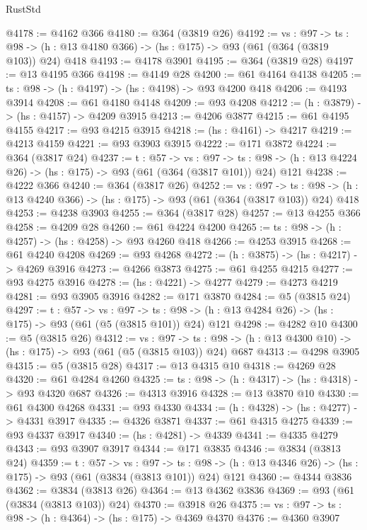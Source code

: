 \begin{lexlean}{RustStd}
\begin{coremodule}
@4178 := @4162 @366
@4180 := @364 (@3819 @26)
@4192 := {vs : @97} ->
  {ts : @98} -> (h : @13 @4180 @366) -> (hs : @175) -> @93 (@61 (@364 (@3819 @103)) @24) @418
@4193 := @4178 @3901
@4195 := @364 (@3819 @28)
@4197 := @13 @4195 @366
@4198 := @4149 @28
@4200 := @61 @4164 @4138
@4205 := {ts : @98} -> (h : @4197) -> (hs : @4198) -> @93 @4200 @418
@4206 := @4193 @3914
@4208 := @61 @4180 @4148
@4209 := @93 @4208
@4212 := (h : @3879) -> (hs : @4157) -> @4209 @3915
@4213 := @4206 @3877
@4215 := @61 @4195 @4155
@4217 := @93 @4215 @3915
@4218 := (hs : @4161) -> @4217
@4219 := @4213 @4159
@4221 := @93 @3903 @3915
@4222 := @171 @3872
@4224 := @364 (@3817 @24)
@4237 := {t : @57} ->
  {vs : @97} ->
  {ts : @98} -> (h : @13 @4224 @26) -> (hs : @175) -> @93 (@61 (@364 (@3817 @101)) @24) @121
@4238 := @4222 @366
@4240 := @364 (@3817 @26)
@4252 := {vs : @97} ->
  {ts : @98} -> (h : @13 @4240 @366) -> (hs : @175) -> @93 (@61 (@364 (@3817 @103)) @24) @418
@4253 := @4238 @3903
@4255 := @364 (@3817 @28)
@4257 := @13 @4255 @366
@4258 := @4209 @28
@4260 := @61 @4224 @4200
@4265 := {ts : @98} -> (h : @4257) -> (hs : @4258) -> @93 @4260 @418
@4266 := @4253 @3915
@4268 := @61 @4240 @4208
@4269 := @93 @4268
@4272 := (h : @3875) -> (hs : @4217) -> @4269 @3916
@4273 := @4266 @3873
@4275 := @61 @4255 @4215
@4277 := @93 @4275 @3916
@4278 := (hs : @4221) -> @4277
@4279 := @4273 @4219
@4281 := @93 @3905 @3916
@4282 := @171 @3870
@4284 := @5 (@3815 @24)
@4297 := {t : @57} ->
  {vs : @97} ->
  {ts : @98} -> (h : @13 @4284 @26) -> (hs : @175) -> @93 (@61 (@5 (@3815 @101)) @24) @121
@4298 := @4282 @10
@4300 := @5 (@3815 @26)
@4312 := {vs : @97} ->
  {ts : @98} -> (h : @13 @4300 @10) -> (hs : @175) -> @93 (@61 (@5 (@3815 @103)) @24) @687
@4313 := @4298 @3905
@4315 := @5 (@3815 @28)
@4317 := @13 @4315 @10
@4318 := @4269 @28
@4320 := @61 @4284 @4260
@4325 := {ts : @98} -> (h : @4317) -> (hs : @4318) -> @93 @4320 @687
@4326 := @4313 @3916
@4328 := @13 @3870 @10
@4330 := @61 @4300 @4268
@4331 := @93 @4330
@4334 := (h : @4328) -> (hs : @4277) -> @4331 @3917
@4335 := @4326 @3871
@4337 := @61 @4315 @4275
@4339 := @93 @4337 @3917
@4340 := (hs : @4281) -> @4339
@4341 := @4335 @4279
@4343 := @93 @3907 @3917
@4344 := @171 @3835
@4346 := @3834 (@3813 @24)
@4359 := {t : @57} ->
  {vs : @97} ->
  {ts : @98} -> (h : @13 @4346 @26) -> (hs : @175) -> @93 (@61 (@3834 (@3813 @101)) @24) @121
@4360 := @4344 @3836
@4362 := @3834 (@3813 @26)
@4364 := @13 @4362 @3836
@4369 := @93 (@61 (@3834 (@3813 @103)) @24)
@4370 := @3918 @26
@4375 := {vs : @97} -> {ts : @98} -> (h : @4364) -> (hs : @175) -> @4369 @4370
@4376 := @4360 @3907

\end{coremodule}
\end{lexlean}
